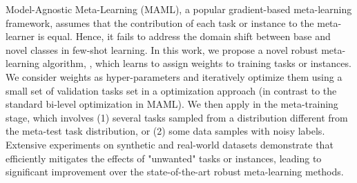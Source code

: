Model-Agnostic Meta-Learning (MAML), a popular gradient-based meta-learning framework, assumes that the contribution of each task or instance to the meta-learner is equal. Hence, it fails to address the domain shift between base and novel classes in few-shot learning. In this work, we propose a novel robust meta-learning algorithm,  \sysname{}, which learns to assign weights to training tasks or instances. We consider weights as hyper-parameters and iteratively optimize them using a small set of validation tasks set in a \biopt{} optimization approach (in contrast to the standard bi-level optimization in MAML). We then apply \sysname{} in the meta-training stage, which involves (1) several tasks sampled from a distribution different from the meta-test task distribution, or (2) some data samples with noisy labels. Extensive experiments on synthetic and real-world datasets demonstrate that \sysname{} efficiently mitigates the effects of "unwanted" tasks or instances, leading to significant improvement over the state-of-the-art robust meta-learning methods.



